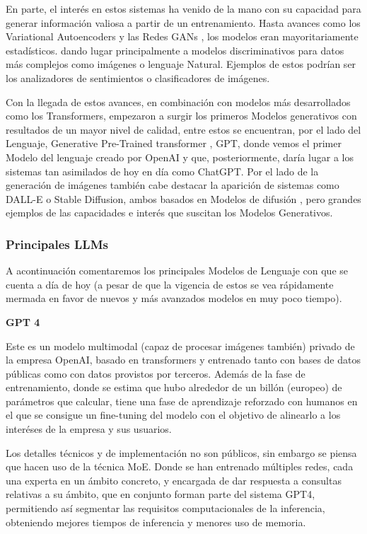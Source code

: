 En parte, el interés en estos sistemas ha venido de la mano con su capacidad para generar información valiosa a partir de un entrenamiento. Hasta avances como los Variational Autoencoders \cite{kingma2013auto} y las Redes GANs \cite{goodfellow2014generative}, los modelos eran mayoritariamente estadísticos. dando lugar principalmente a modelos discriminativos para datos más complejos como imágenes o lenguaje Natural. Ejemplos de estos podrían ser los analizadores de sentimientos o clasificadores de imágenes.

Con la llegada de estos avances, en combinación con modelos más desarrollados como los Transformers, empezaron a surgir los primeros Modelos generativos con resultados de un mayor nivel de calidad, entre estos se encuentran, por el lado del Lenguaje, Generative Pre-Trained transformer \citep {radford2018improving}, GPT, donde vemos el primer Modelo del lenguaje creado por OpenAI y que, posteriormente, daría lugar a los sistemas tan asimilados de hoy en día como ChatGPT. Por el lado de la generación de imágenes también cabe destacar la aparición de sistemas como DALL-E o Stable Diffusion, ambos basados en Modelos de difusión \cite{}, pero grandes ejemplos de las capacidades e interés que suscitan los Modelos Generativos.

\subsubsection{Principales LLMs}

A acontinuación comentaremos los principales Modelos de Lenguaje con que se cuenta a día de hoy (a pesar de que la vigencia de estos se vea rápidamente mermada en favor de nuevos y más avanzados modelos en muy poco tiempo). 

\textbf{GPT 4}

Este es un modelo multimodal (capaz de procesar imágenes también) privado de la empresa OpenAI, basado en transformers y entrenado tanto con bases de datos públicas como con datos provistos por terceros. Además de la fase de entrenamiento, donde se estima que hubo alrededor de un billón (europeo) de parámetros que calcular, tiene una fase de aprendizaje reforzado con humanos en el que se consigue un fine-tuning del modelo con el objetivo de alinearlo a los interéses de la empresa y sus usuarios.

Los detalles técnicos y de implementación no son públicos, sin embargo se piensa que hacen uso de la técnica MoE. Donde se han entrenado múltiples redes, cada una experta en un ámbito concreto, y encargada de dar respuesta a consultas relativas a su ámbito, que en conjunto forman parte del sistema GPT4, permitiendo así segmentar las requisitos computacionales de la inferencia, obteniendo mejores tiempos de inferencia y menores uso de memoria.

